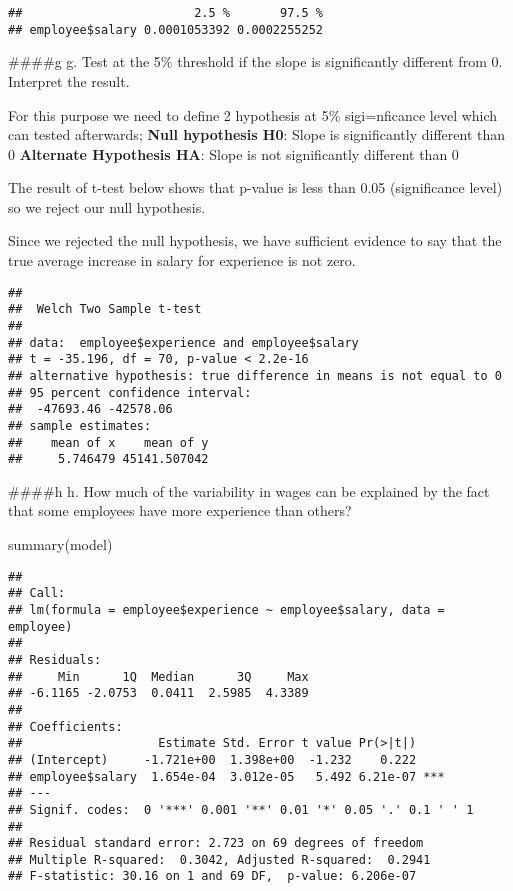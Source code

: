 \documentclass[
]{article}
\newenvironment{Shaded}{\begin{snugshade}}{\end{snugshade}}
\newcommand{\AttributeTok}[1]{\textcolor[rgb]{0.77,0.63,0.00}{#1}}
\newcommand{\FunctionTok}[1]{\textcolor[rgb]{0.00,0.00,0.00}{#1}}
\newcommand{\NormalTok}[1]{#1}
\newcommand{\SpecialCharTok}[1]{\textcolor[rgb]{0.00,0.00,0.00}{#1}}
\begin{document}
\begin{verbatim}
##                        2.5 %       97.5 %
## employee$salary 0.0001053392 0.0002255252
\end{verbatim}

\#\#\#\#g g. Test at the 5\% threshold if the slope is significantly
different from 0. Interpret the result.

For this purpose we need to define 2 hypothesis at 5\% sigi=nficance
level which can tested afterwards; \textbf{Null hypothesis H0}: Slope is
significantly different than 0 \textbf{Alternate Hypothesis HA}: Slope
is not significantly different than 0

The result of t-test below shows that p-value is less than 0.05
(significance level) so we reject our null hypothesis.

Since we rejected the null hypothesis, we have sufficient evidence to
say that the true average increase in salary for experience is not zero.

\begin{Shaded}
\end{Shaded}

\begin{verbatim}
## 
##  Welch Two Sample t-test
## 
## data:  employee$experience and employee$salary
## t = -35.196, df = 70, p-value < 2.2e-16
## alternative hypothesis: true difference in means is not equal to 0
## 95 percent confidence interval:
##  -47693.46 -42578.06
## sample estimates:
##    mean of x    mean of y 
##     5.746479 45141.507042
\end{verbatim}

\#\#\#\#h h. How much of the variability in wages can be explained by
the fact that some employees have more experience than others?

\begin{Shaded}
\begin{Highlighting}[]
\FunctionTok{summary}\NormalTok{(model)}
\end{Highlighting}
\end{Shaded}

\begin{verbatim}
## 
## Call:
## lm(formula = employee$experience ~ employee$salary, data = employee)
## 
## Residuals:
##     Min      1Q  Median      3Q     Max 
## -6.1165 -2.0753  0.0411  2.5985  4.3389 
## 
## Coefficients:
##                   Estimate Std. Error t value Pr(>|t|)    
## (Intercept)     -1.721e+00  1.398e+00  -1.232    0.222    
## employee$salary  1.654e-04  3.012e-05   5.492 6.21e-07 ***
## ---
## Signif. codes:  0 '***' 0.001 '**' 0.01 '*' 0.05 '.' 0.1 ' ' 1
## 
## Residual standard error: 2.723 on 69 degrees of freedom
## Multiple R-squared:  0.3042, Adjusted R-squared:  0.2941 
## F-statistic: 30.16 on 1 and 69 DF,  p-value: 6.206e-07
\end{verbatim}
\end{document}
